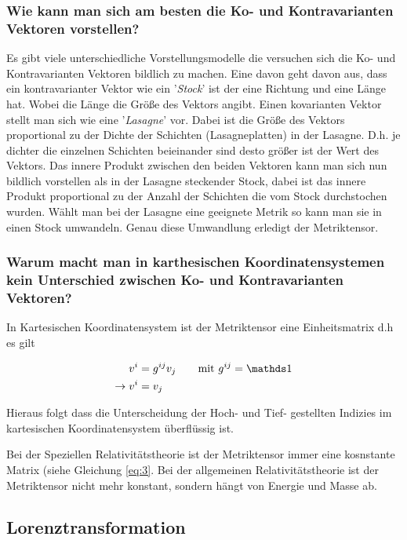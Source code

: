 \subsubsection*{Wie kann man sich am besten die Ko- und Kontravarianten Vektoren vorstellen?} 

Es gibt viele unterschiedliche Vorstellungsmodelle die versuchen sich die Ko- und Kontravarianten Vektoren bildlich zu machen. Eine davon geht davon aus, dass ein kontravarianter Vektor wie ein '\textit{Stock}' ist der eine Richtung und eine Länge hat. Wobei die Länge die Größe des Vektors angibt. Einen kovarianten Vektor stellt man sich wie eine '\textit{Lasagne}' vor. Dabei ist die Größe des Vektors proportional zu der Dichte der Schichten (Lasagneplatten) in der Lasagne. D.h. je dichter die einzelnen Schichten beieinander sind desto größer ist der Wert des Vektors. Das innere Produkt zwischen den beiden Vektoren kann man sich nun bildlich vorstellen als in der Lasagne steckender Stock, dabei ist das innere Produkt proportional zu der Anzahl der Schichten die vom Stock durchstochen wurden. Wählt man bei der Lasagne eine geeignete Metrik so kann man sie in einen Stock umwandeln. Genau diese Umwandlung erledigt der Metriktensor. 

\subsubsection*{Warum macht man in karthesischen Koordinatensystemen kein Unterschied zwischen Ko- und Kontravarianten Vektoren? }

In Kartesischen Koordinatensystem ist der Metriktensor eine Einheitsmatrix d.h es gilt

\begin{align}
  \label{eq:20}
  v^i &= g^{ij}v_j \qquad\text{mit } g^{ij}=\mathds 1 \notag \\
\rightarrow v^i &= v_j 
\end{align}

Hieraus folgt dass die Unterscheidung der Hoch- und Tief- gestellten Indizies im kartesischen Koordinatensystem überflüssig ist. 

Bei der Speziellen Relativitätstheorie ist der Metriktensor immer eine kosnstante Matrix (siehe Gleichung \eqref{eq:3}. Bei der allgemeinen Relativitätstheorie ist der Metriktensor nicht mehr konstant, sondern hängt von Energie und Masse ab.


\subsection*{Lorenztransformation}

